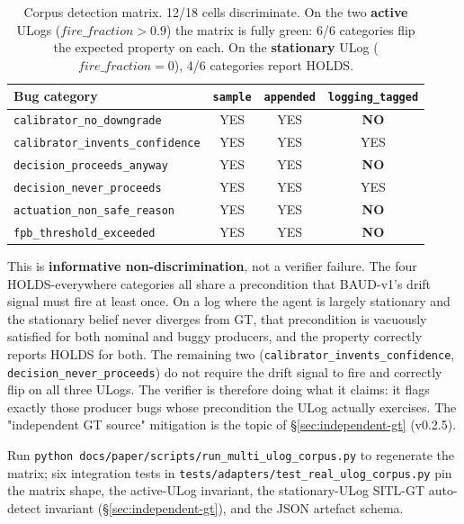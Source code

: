 \documentclass[11pt,a4paper]{article}
\begin{document}
\begin{table}[h]
\centering\small
\begin{tabular}{l c c c}
\toprule
\textbf{Bug category} & \texttt{sample} & \texttt{appended} & \texttt{logging\_tagged} \\
\midrule
\texttt{calibrator\_no\_downgrade}        & YES & YES & \textbf{NO}  \\
\texttt{calibrator\_invents\_confidence}  & YES & YES & YES \\
\texttt{decision\_proceeds\_anyway}       & YES & YES & \textbf{NO}  \\
\texttt{decision\_never\_proceeds}        & YES & YES & YES \\
\texttt{actuation\_non\_safe\_reason}     & YES & YES & \textbf{NO}  \\
\texttt{fpb\_threshold\_exceeded}         & YES & YES & \textbf{NO}  \\
\bottomrule
\end{tabular}
\caption{Corpus detection matrix. 12/18 cells discriminate.
On the two \textbf{active} ULogs ($\mathit{fire\_fraction} > 0.9$)
the matrix is fully green: 6/6 categories flip the expected
property on each. On the \textbf{stationary} ULog
($\mathit{fire\_fraction} = 0$), 4/6 categories report HOLDS.}
\label{tab:multi-ulog-corpus}
\end{table}

This is \textbf{informative non-discrimination}, not a verifier
failure. The four HOLDS-everywhere categories all share a
precondition that BAUD-v1's drift signal must fire at least
once. On a log where the agent is largely stationary and the
stationary belief never diverges from GT, that precondition is
vacuously satisfied for both nominal and buggy producers, and
the property correctly reports HOLDS for both. The remaining
two (\texttt{calibrator\_invents\_confidence},
\texttt{decision\_never\_proceeds}) do not require the drift
signal to fire and correctly flip on all three ULogs. The
verifier is therefore doing what it claims: it flags exactly
those producer bugs whose precondition the ULog actually
exercises. The "independent GT source" mitigation is the topic
of \S\ref{sec:independent-gt} (v0.2.5).

Run \texttt{python docs/paper/scripts/run\_multi\_ulog\_corpus.py}
to regenerate the matrix; six integration tests in
\texttt{tests/adapters/test\_real\_ulog\_corpus.py} pin the
matrix shape, the active-ULog invariant, the stationary-ULog
SITL-GT auto-detect invariant (\S\ref{sec:independent-gt}),
and the JSON artefact schema.
\end{document}
